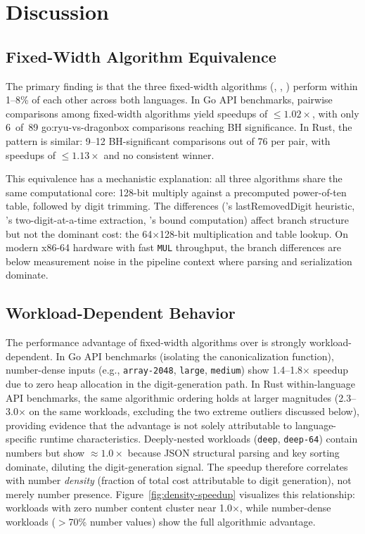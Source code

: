 \section{Discussion}
\label{sec:discussion}

\subsection{Fixed-Width Algorithm Equivalence}

The primary finding is that the three fixed-width algorithms
(\schubfach, \ryualg, \dragonbox) perform within 1--8\% of each other
across both languages.  In Go API benchmarks, pairwise comparisons among
fixed-width algorithms yield speedups of ${\leq}1.02\times$, with only
6~of~89 go:ryu-vs-dragonbox comparisons reaching BH significance.
In Rust, the pattern is similar: 9--12 BH-significant comparisons
out of 76 per pair, with speedups of ${\leq}1.13\times$ and no
consistent winner.

This equivalence has a mechanistic explanation: all three algorithms
share the same computational core: 128-bit multiply against a
precomputed power-of-ten table, followed by digit trimming.  The
differences (\ryualg's lastRemovedDigit heuristic, \dragonbox's
two-digit-at-a-time extraction, \schubfach's bound computation) affect
branch structure but not the dominant cost: the 64$\times$128-bit
multiplication and table lookup.  On modern x86-64 hardware with fast
\texttt{MUL} throughput, the branch differences are below measurement
noise in the pipeline context where parsing and serialization dominate.

\subsection{Workload-Dependent Behavior}

The performance advantage of fixed-width algorithms over \burgerdybvig is
strongly workload-dependent.  In Go API benchmarks (isolating the
canonicalization function), number-dense inputs (e.g.,
\texttt{array-2048}, \texttt{large}, \texttt{medium}) show
1.4--1.8$\times$ speedup due to zero heap allocation in the
digit-generation path.  In Rust within-language API benchmarks, the same
algorithmic ordering holds at larger magnitudes (2.3--3.0$\times$ on the
same workloads, excluding the two extreme outliers discussed below),
providing evidence that the advantage is not solely attributable to
language-specific runtime characteristics.  Deeply-nested
workloads (\texttt{deep}, \texttt{deep-64}) contain numbers but show
${\approx}1.0\times$ because JSON structural parsing and key sorting
dominate, diluting the digit-generation signal.  The speedup therefore
correlates with number \emph{density} (fraction of total cost attributable
to digit generation), not merely number presence.
Figure~\ref{fig:density-speedup} visualizes this relationship: workloads
with zero number content cluster near 1.0$\times$, while number-dense
workloads ($>$70\% number values) show the full algorithmic advantage.

